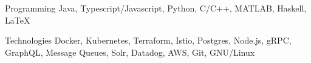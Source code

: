 

\begin{cvskills}

  \cvskill
    {Programming} %
    {Java, Typescript/Javascript, Python, C/C++, MATLAB, Haskell, LaTeX} %

  \cvskill
    {Technologies} %
    {Docker, Kubernetes, Terraform, Istio, Postgres, Node.js, gRPC, GraphQL, Message Queues, Solr, Datadog, AWS, Git, GNU/Linux} %

\end{cvskills}
